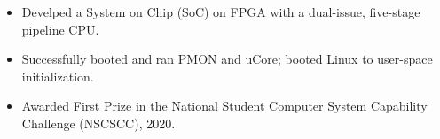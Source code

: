 \documentclass{resume}
\begin{document}
\begin{itemize}
  \item Develped a System on Chip (SoC) on FPGA with a dual-issue, five-stage pipeline CPU. 
  \item Successfully booted and ran PMON and uCore; booted Linux to user-space initialization.
  \item Awarded First Prize in the National Student Computer System Capability Challenge (NSCSCC), 2020.
\end{itemize}

\end{document}
